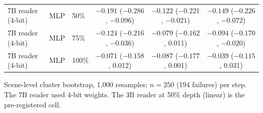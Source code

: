 \documentclass[11pt]{article}
\begin{document}
\begin{table}[h]
\begin{tabular}{@{}lllccc@{}}
7B reader (4-bit) & MLP & 50\% & $-0.191$ ($-0.286$, $-0.096$) & $-0.122$ ($-0.221$, $-0.021$) & $-0.149$ ($-0.226$, $-0.072$) \\
7B reader (4-bit) & MLP & 75\% & $-0.124$ ($-0.216$, $-0.036$) & $-0.079$ ($-0.162$, 0.011) & $-0.094$ ($-0.170$, $-0.020$) \\
7B reader (4-bit) & MLP & 100\% & $-0.071$ ($-0.158$, 0.012) & $-0.087$ ($-0.177$, 0.001) & $-0.039$ ($-0.115$, 0.031) \\
\bottomrule
\end{tabular}
\par\smallskip\raggedright\footnotesize
Scene-level cluster bootstrap, 1,000 resamples; $n = 250$ (194 failures) per step. The 7B reader used 4-bit weights. The 3B reader at 50\% depth (linear) is the pre-registered cell.
\end{table}
\end{document}
